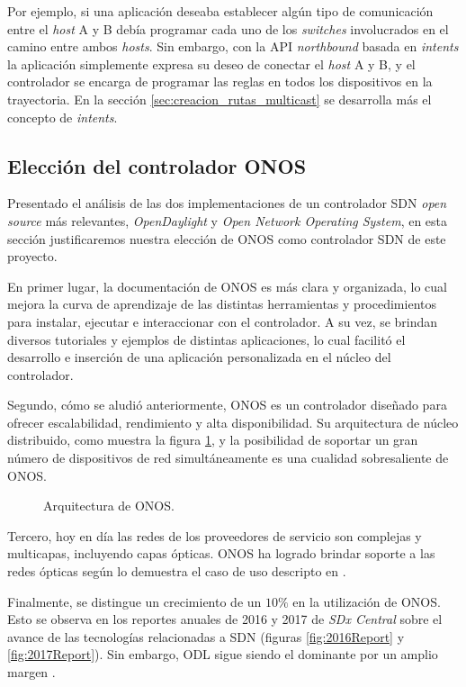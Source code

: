 Por ejemplo, si una aplicación deseaba establecer algún tipo de comunicación entre el \textit{host} A y B debía programar cada uno de los \textit{switches} involucrados en el camino entre ambos \textit{hosts}. Sin embargo, con la API \textit{northbound} basada en \textit{intents} la aplicación simplemente expresa su deseo de conectar el \textit{host} A y B, y el controlador se encarga de programar las reglas en todos los dispositivos en la trayectoria. En la sección \ref{sec:creacion_rutas_multicast} se desarrolla más el concepto de \textit{intents}.

\subsection{Elección del controlador ONOS}

Presentado el análisis de las dos implementaciones de un controlador SDN \textit{open source} más relevantes, \textit{OpenDaylight} y \textit{Open Network Operating System}, en esta sección justificaremos nuestra elección de ONOS como controlador SDN de este proyecto.

En primer lugar, la documentación de ONOS es más clara y organizada, lo cual mejora la curva de aprendizaje de las distintas herramientas y procedimientos para instalar, ejecutar e interaccionar con el controlador. A su vez, se brindan diversos tutoriales y ejemplos de distintas aplicaciones, lo cual facilitó el desarrollo e inserción de una aplicación personalizada en el núcleo del controlador.   

Segundo, cómo se aludió anteriormente, ONOS es un controlador diseñado para ofrecer escalabilidad, rendimiento y alta disponibilidad. Su arquitectura de núcleo distribuido, como muestra la figura \ref{fig:ONOSArq}, y la posibilidad de soportar un gran número de dispositivos de red simultáneamente es una cualidad sobresaliente de ONOS.

\begin{figure}[th]
	\centering 
	\caption[Arquitectura de ONOS]{Arquitectura de ONOS.}
	\label{fig:ONOSArq}
\end{figure}

Tercero, hoy en día las redes de los proveedores de servicio son complejas y multicapas, incluyendo capas ópticas. ONOS ha logrado brindar soporte a las redes ópticas según lo demuestra el caso de uso descripto en \parencite{onosPacketOptical}.

Finalmente, se distingue un crecimiento de un $10\%$ en la utilización de ONOS. Esto se observa en los reportes anuales de 2016 y 2017 de \textit{SDx Central} sobre el avance de las tecnologías relacionadas a SDN (figuras \ref{fig:2016Report} y \ref{fig:2017Report}). Sin embargo, ODL sigue siendo el dominante por un amplio margen \parencite{SDXCentralReport}.  

